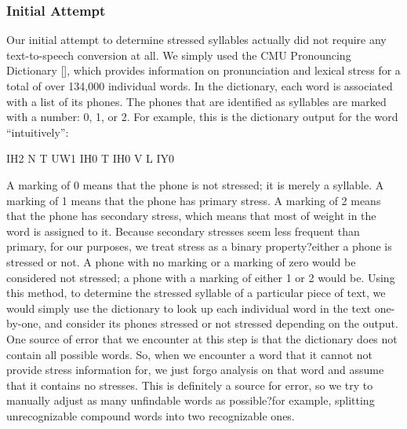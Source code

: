 \documentclass[pageno]{jpaper}
\newcommand{\quotes}[1]{``#1''}
\begin{document}
\subsubsection{Initial Attempt }
Our initial attempt to determine stressed syllables actually did not require any text-to-speech conversion at all. We simply used the CMU Pronouncing Dictionary [], which provides information on pronunciation and lexical stress for a total of over 134,000 individual words. In the dictionary, each word is associated with a list of its phones. The phones that are identified as syllables are marked with a number: 0, 1, or 2. For example, this is the dictionary output for the word \quotes{intuitively}:

\begin{center}
IH2 \hspace{1 mm} N  \hspace{1 mm} T  \hspace{1 mm} UW1 \hspace{1 mm}  IH0 \hspace{1 mm} T  \hspace{1 mm} IH0 \hspace{1 mm}  V  \hspace{1 mm} L  \hspace{1 mm} IY0
\end{center}

A marking of 0 means that the phone is not stressed; it is merely a syllable. A marking of 1 means that the phone has primary stress. A marking of 2 means that the phone has secondary stress, which means that most of weight in the word is assigned to it. Because secondary stresses seem less frequent than primary, for our purposes, we treat stress as a binary property?either a phone is stressed or not. A phone with no marking or a marking of zero would be considered not stressed; a phone with a marking of either 1 or 2 would be. Using this method, to determine the stressed syllable of a particular piece of text, we would simply use the dictionary to look up each individual word in the text one-by-one, and consider its phones stressed or not stressed depending on the output. One source of error that we encounter at this step is that the dictionary does not contain all possible words. So, when we encounter a word that it cannot not provide stress information for, we just forgo analysis on that word and assume that it contains no stresses. This is definitely a source for error, so we try to manually adjust as many unfindable words as possible?for example, splitting unrecognizable compound words into two recognizable ones.
\end{document}
